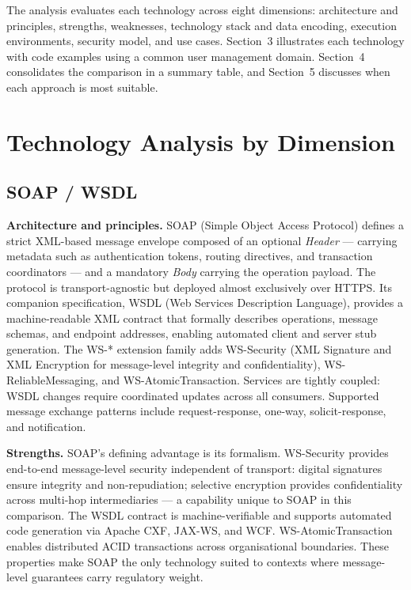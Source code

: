 \documentclass[11pt,a4paper]{article}
\begin{document}
The analysis evaluates each technology across eight dimensions: architecture and
principles, strengths, weaknesses, technology stack and data encoding, execution
environments, security model, and use cases. Section~3 illustrates each technology with
code examples using a common user management domain. Section~4 consolidates the
comparison in a summary table, and Section~5 discusses when each approach is most
suitable.

\section{Technology Analysis by Dimension}

\subsection{SOAP / WSDL}

\textbf{Architecture and principles.}
SOAP (Simple Object Access Protocol) defines a strict XML-based message envelope
composed of an optional \textit{Header} --- carrying metadata such as authentication
tokens, routing directives, and transaction coordinators --- and a mandatory
\textit{Body} carrying the operation payload. The protocol is transport-agnostic but
deployed almost exclusively over HTTPS. Its companion specification, WSDL (Web Services
Description Language), provides a machine-readable XML contract that formally describes
operations, message schemas, and endpoint addresses, enabling automated client and server
stub generation. The WS-* extension family adds WS-Security (XML Signature and XML
Encryption for message-level integrity and confidentiality), WS-ReliableMessaging, and
WS-AtomicTransaction. Services are tightly coupled: WSDL changes require coordinated
updates across all consumers. Supported message exchange patterns include request-response,
one-way, solicit-response, and notification.

\textbf{Strengths.}
SOAP's defining advantage is its formalism. WS-Security provides end-to-end message-level
security independent of transport: digital signatures ensure integrity and non-repudiation;
selective encryption provides confidentiality across multi-hop intermediaries --- a
capability unique to SOAP in this comparison. The WSDL contract is machine-verifiable
and supports automated code generation via Apache CXF, JAX-WS, and WCF. WS-AtomicTransaction
enables distributed ACID transactions across organisational boundaries. These properties
make SOAP the only technology suited to contexts where message-level guarantees carry
regulatory weight.
\end{document}
